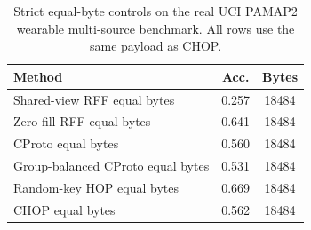 \begin{table}[t]
\centering
\caption{Strict equal-byte controls on the real UCI PAMAP2 wearable multi-source benchmark. All rows use the same payload as CHOP.}
\label{tab:strict-equal-byte-pamap2}
\begin{tabular}{lcc}
\toprule
Method & Acc. & Bytes \\
\midrule
Shared-view RFF equal bytes & 0.257 & 18484 \\
Zero-fill RFF equal bytes & 0.641 & 18484 \\
CProto equal bytes & 0.560 & 18484 \\
Group-balanced CProto equal bytes & 0.531 & 18484 \\
Random-key HOP equal bytes & 0.669 & 18484 \\
CHOP equal bytes & 0.562 & 18484 \\
\bottomrule
\end{tabular}
\end{table}
